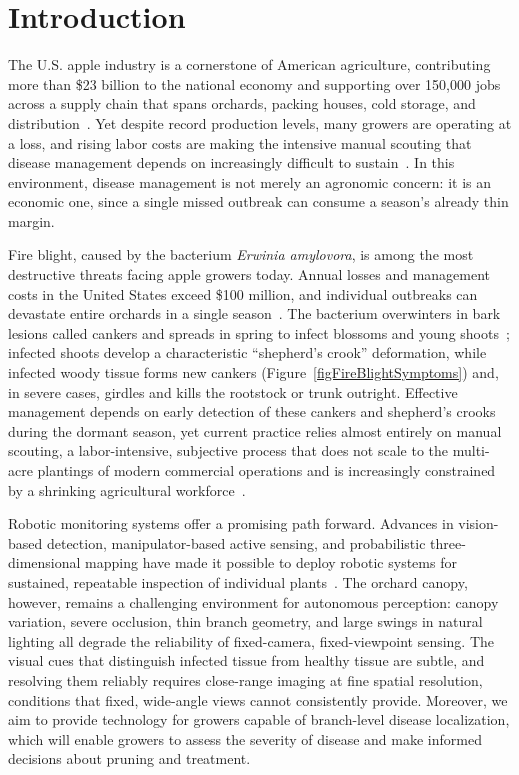 
\chapter{Introduction} \label{chapIntroduction}

The U.S. apple industry is a cornerstone of American agriculture, contributing
more than \$23 billion to the national economy and supporting over 150,000
jobs across a supply chain that spans orchards, packing houses, cold storage,
and distribution~\cite{gerlach2025usapple}.
Yet despite record production levels, many growers are operating at a loss,
and rising labor costs are making the intensive manual scouting that disease
management depends on increasingly difficult to
sustain~\cite{gerlach2025usapple}.
In this environment, disease management is not merely an agronomic
concern: it is an economic one, since a single missed outbreak can consume
a season's already thin margin.

Fire blight, caused by the bacterium \textit{Erwinia amylovora}, is among the
most destructive threats facing apple growers today.
Annual losses and management costs in the United States exceed \$100 million,
and individual outbreaks can devastate entire orchards in a single
season~\cite{Norelli2003FireBlightManagementTwentyFirst,
acimovic2026fireblight}.
The bacterium overwinters in bark lesions called cankers and spreads in spring
to infect blossoms and young shoots~\cite{van1979FireBlight}; infected shoots
develop a characteristic ``shepherd's crook'' deformation, while infected
woody tissue forms new cankers (Figure~\ref{figFireBlightSymptoms}) and, in
severe cases, girdles and kills the rootstock or trunk outright.
Effective management depends on early detection of these cankers and
shepherd's crooks during the dormant season, yet current practice relies
almost entirely on manual scouting, a labor-intensive, subjective process
that does not scale to the multi-acre plantings of modern commercial
operations and is increasingly constrained by a shrinking agricultural
workforce~\cite{gerlach2025usapple}.

Robotic monitoring systems offer a promising path forward.
Advances in vision-based detection, manipulator-based active sensing, and
probabilistic three-dimensional mapping have made it possible to deploy
robotic systems for sustained, repeatable inspection of individual
plants~\cite{droukas2023survey}.
The orchard canopy, however, remains a challenging environment for autonomous
perception: canopy variation, severe occlusion, thin branch geometry, and
large swings in natural lighting all degrade the reliability of fixed-camera,
fixed-viewpoint sensing.
The visual cues that distinguish infected tissue from healthy tissue are
subtle, and resolving them reliably requires close-range imaging at fine
spatial resolution, conditions that fixed, wide-angle views cannot
consistently provide.
Moreover, we aim to provide technology for growers capable of branch-level
disease localization, which will enable growers to assess the severity of
disease and make informed decisions about pruning and treatment.

